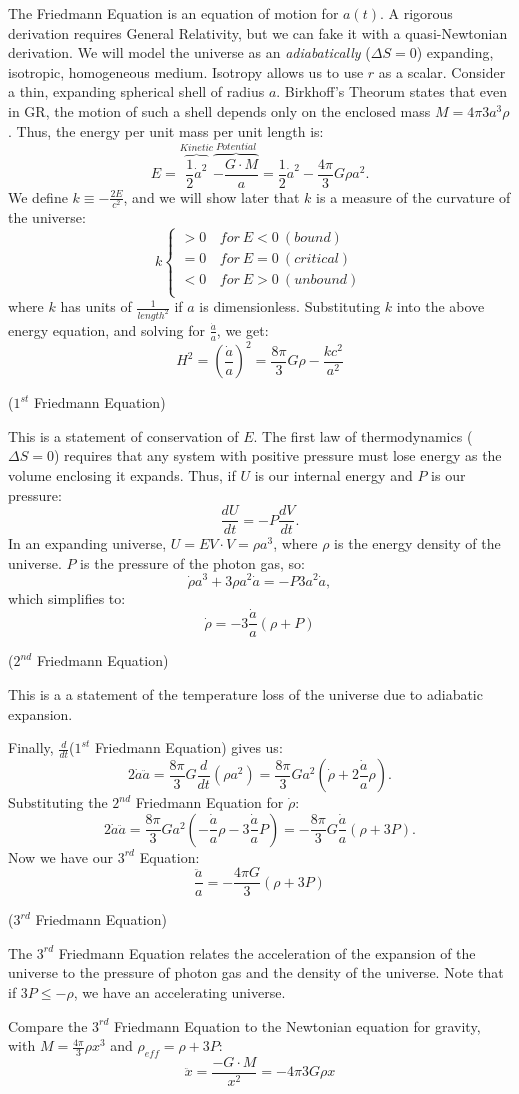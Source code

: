 \documentclass{article}
\def\hf{\frac12}
\def\inv#1{\frac{1}{ #1}}
\def\ddt{\frac{d}{dt}}
\def\aa{\frac{\dot a }{ a}}
\def\ddt{\frac{d}{dt}}
\def\epot{\frac{8\pi}{ 3}}
\def\hf{\frac12}
\def\ddt{{\frac{d}{dt}}}
\def\paap{\left(\aa\right)}
\begin{document}
The Friedmann Equation is an equation of motion for $a(t)$.  A rigorous
derivation requires General Relativity, but we can fake it with a
quasi-Newtonian derivation.
We will model the universe as an {\it adiabatically} ($\Delta S=0$) expanding,
isotropic, homogeneous medium.  Isotropy allows us to use $r$ as a scalar.
Consider a thin, expanding spherical shell of radius $a$.
Birkhoff's Theorum states that even in GR,
the motion of such a shell depends only on the enclosed mass 
$M={4\pi }{ 3}a^3\rho$.
Thus, the energy per unit mass per unit length is:
$$E=\overbrace{\hf \dot a^2}^{Kinetic}\overbrace{-\frac{G\cdot M}{ a}}^{Potential}
=\hf \dot a^2-\frac{4\pi }{ 3}G\rho a^2.$$
We define $k\equiv-\frac{2E}{ c^2}$, and we will show later that $k$ is a measure
of the curvature of the universe: 
$$k\begin{cases}
>0&\,for\ E<0\ (bound)\\
=0&\,for\ E=0\ (critical)\\
<0&\,for\ E>0\ (unbound)\\\end{cases}$$
where $k$ has units of $\inv{length^2}$ if $a$ is dimensionless.  Substituting
$k$ into the above energy equation, and solving for $\aa$, we get:
\def\paap{\left(\aa\right)}
$$\boxed{H^2=\paap^2=\epot G\rho -\frac{k c^2 }{ a^2}}$$
\centerline{($1^{st}$ Friedmann Equation)}
This is a statement of conservation of $E$.
The first law of thermodynamics ($\Delta S=0$) requires that any 
system with positive pressure must lose energy as the volume enclosing it
expands.  Thus, if $U$ is our internal energy and $P$ is our pressure:
$$\frac{dU}{ dt}=-P\frac{dV}{ dt}.$$  
In an expanding universe, $U={E}{ V}\cdot V=\rho a^3$, where $\rho$ is the
energy density of the universe.  $P$ is the pressure of the photon gas, so:
$$\dot \rho a^3+3\rho a^2\dot a=-P 3a^2\dot a,$$ 
which simplifies to:
$$\boxed{\dot \rho=-3\aa(\rho +P)}$$
\centerline{($2^{nd}$ Friedmann Equation)}
This is a a statement of the temperature loss of the universe 
due to adiabatic expansion.\par
Finally, $\ddt$($1^{st}$ Friedmann Equation) gives us:
$$2\dot a\ddot a=\epot G \frac{d }{ dt}(\rho a^2) =\epot G a^2(\dot \rho +2\aa \rho).$$
Substituting the $2^{nd}$ Friedmann Equation for $\dot \rho$:
$$2\dot a\ddot a=\epot Ga^2 (-\aa \rho -3 \aa P) =-\epot G \aa (\rho +3P).$$  
Now we have our $3^{rd}$ Equation:
$$\boxed{\frac{\ddot {a }}{ a}=-\frac{4\pi G} {3} (\rho + 3P)}$$
\centerline{($3^{rd}$ Friedmann Equation)}
The $3^{rd}$ Friedmann Equation relates the acceleration of the expansion of
the universe to the pressure of photon gas and the density of the universe.
Note that if $3P \le -\rho$, we have an accelerating universe.\par
Compare the $3^{rd}$ Friedmann Equation to the Newtonian equation for gravity,
with $M=\frac{4\pi }{ 3}\rho x^3$ and $\rho_{eff}=\rho +3P$:
$$\ddot x=\frac{-G\cdot M}{ x^2}={-4\pi }{ 3}G\rho x$$
\end{document}
